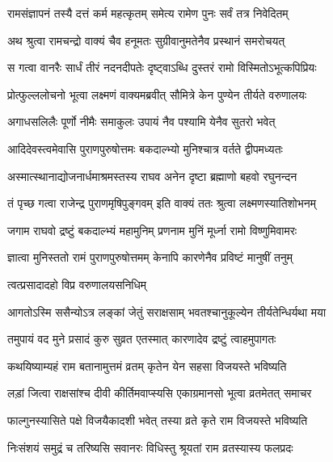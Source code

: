 \twolineshloka
{रामसंज्ञापनं तस्यै दत्तं कर्म महत्कृतम्}
{समेत्य रामेण पुनः सर्वं तत्र निवेदितम्} %

\twolineshloka
{अथ श्रुत्वा रामचन्द्रो वाक्यं चैव हनूमतः}
{सुग्रीवानुमतेनैव प्रस्थानं समरोचयत्} %

\twolineshloka
{स गत्वा वानरैः सार्धं तीरं नदनदीपतेः}
{दृष्ट्वाऽब्धि दुस्तरं रामो विस्मितोऽभूत्कपिप्रियः} %

\twolineshloka
{प्रोत्फुल्ललोचनो भूत्वा लक्ष्मणं वाक्यमब्रवीत्}
{सौमित्रे केन पुण्येन तीर्यते वरुणालयः} %

\twolineshloka
{अगाधसलिलैः पूर्णो नीमैः समाकुलः}
{उपायं नैव पश्यामि येनैव सुतरो भवेत्} %


\twolineshloka
{आदिदेवस्त्वमेवासि पुराणपुरुषोत्तमः}
{बकदाल्भ्यो मुनिश्चात्र वर्तते द्वीपमध्यतः} %

\twolineshloka
{अस्मात्स्थानाद्योजनार्धमाश्रमस्तस्य राघव}
{अनेन दृष्टा ब्रह्माणो बहवो रघुनन्दन} %

\twolineshloka
{तं पृच्छ गत्वा राजेन्द्र पुराणमृषिपुङ्गवम्}
{इति वाक्यं ततः श्रुत्वा लक्ष्मणस्यातिशोभनम्} %

\twolineshloka
{जगाम राघवो द्रष्टुं बकदाल्भ्यं महामुनिम्}
{प्रणनाम मुनिं मूर्ध्ना रामो विष्णुमिवामरः} %

\twolineshloka
{ज्ञात्वा मुनिस्ततो रामं पुराणपुरुषोत्तमम्}
{केनापि कारणेनैव प्रविष्टं मानुषीं तनुम्} %



\onelineshloka
{त्वत्प्रसादादहो विप्र वरुणालयसनिधिम्} %

\twolineshloka
{आगतोऽस्मि ससैन्योऽत्र लङ्कां जेतुं सराक्षसाम्}
{भवतश्चानुकूल्येन तीर्यतेन्धिर्यथा मया} %

\twolineshloka
{तमुपायं वद मुने प्रसादं कुरु सुव्रत}
{एतस्मात् कारणादेव द्रष्टुं त्वाहमुपागतः} %


\twolineshloka
{कथयिष्याम्यहं राम बतानामुत्तमं व्रतम्}
{कृतेन येन सहसा विजयस्ते भविष्यति} %

\twolineshloka
{लड़ां जित्वा राक्षसांश्च दीवी कीर्तिमवाप्स्यसि}
{एकाग्रमानसो भूत्वा व्रतमेतत् समाचर} %

\twolineshloka
{फाल्गुनस्यासिते पक्षे विजयैकादशी भवेत्}
{तस्या व्रते कृते राम विजयस्ते भविष्यति} %

\twolineshloka
{निःसंशयं समुद्रं च तरिष्यसि सवानरः}
{विधिस्तु श्रूयतां राम व्रतस्यास्य फलप्रदः} %

